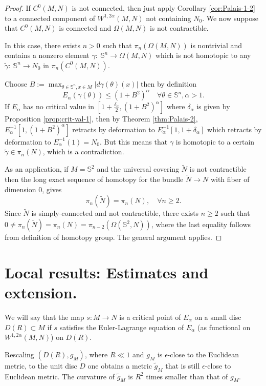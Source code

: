\begin{proof}
If \(C^0(M,N)\) is not connected, then just apply Corollary \ref{cor:Palais-1-2} to a
connected component of \(W^{1,2\alpha}(M,N)\) not containing \(N_0\). We now suppose
that \(C^0(M,N)\) is connected and \(\Omega(M,N)\) is not contractible.


In this case, there exists \(n>0\) such that \(\pi_n(\Omega(M,N))\) is nontrivial and
contains a nonzero element \(\gamma:\ \mathbb{S}^n \longrightarrow  \Omega(M,N)\)
which is not homotopic to any \(\tilde\gamma:\ \mathbb{S}^n \longrightarrow N_0\) in \(\pi_n(C^0(M,N))\).


Choose \(B:= \max_{\theta\in \mathbb{S}^n,x\in M} |d\gamma(\theta)(x)|\) then by
definition
\[
 E_\alpha(\gamma(\theta)) \leq (1+B^2)^\alpha\quad\forall \theta\in \mathbb{S}^n,\alpha>1.
\]
If \(E_\alpha\) has no critical value in \([1+\frac{\delta_\alpha}{2}, (1+B^2)^\alpha]\) where \(\delta_\alpha\) is given by Proposition \ref{prop:crit-val-1}, then by Theorem
\ref{thm:Palais-2}, \(E_\alpha^{-1}[1, (1+B^2)^\alpha]\) retracts by deformation to \(E_\alpha^{-1}[1, 1+\delta_\alpha]\) which retracts by deformation to \(E_\alpha^{-1}(1)=N_0\). But this means that \(\gamma\) is homotopic to a certain \(\tilde\gamma\in \pi_n(N)\), which is a contradiction.


As an application, if \(M= \mathbb{S}^2\) and the universal covering \(\tilde N\) is
not contractible then the long exact sequence of homotopy for the bundle \(\tilde N
\longrightarrow N\) with fiber of dimension \(0\), gives
\[
 \pi_n(\tilde N) = \pi_n(N),\quad \forall n\geq 2.
\]
Since \(\tilde N\) is simply-connected and not contractible, there exists \(n\geq 2\)
such that \(0\ne\pi_n(\tilde N) = \pi_n(N) = \pi_{n-2}(\Omega(\mathbb{S}^2,N))\), where
the last equality follows from definition of homotopy group. The
general argument applies.
\end{proof}


\section{Local results: Estimates and extension.}
\label{sec:org25d7a4d}

We will say that the map \(s: M \longrightarrow N\) is a critical point of \(E_\alpha\) on a small disc \(D(R)\subset M\) if \(s\) satisfies the Euler-Lagrange equation of
\(E_\alpha\) (as functional on \(W^{1,2\alpha}(M,N)\)) on \(D(R)\).

\begin{remark}
\label{rem:rescal-Euclide}
Rescaling \((D(R), g_M)\), where \(R\ll 1\) and \(g_M\) is
\(\epsilon\)-close to the Euclidean metric, to the unit disc \(D\) one obtains a
metric \(\tilde g_M\) that is still \(\epsilon\)-close to Euclidean metric. The
curvature of \(\tilde g_M\) is \(R^2\) times smaller than that of \(g_M\).
\end{remark}

